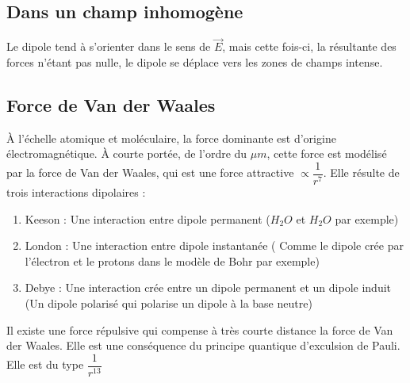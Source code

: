 \subsection{Dans un champ inhomogène}
\begin{prop}
Le dipole tend à s'orienter dans le sens de $\overrightarrow{E}$, mais cette fois-ci, la résultante des forces n'étant pas nulle, le dipole se déplace vers les zones de champs intense.
\end{prop}
\subsection{Force de Van der Waales}
\begin{de}
À l'échelle atomique et moléculaire, la force dominante est d'origine électromagnétique. À courte portée, de l'ordre du $\mu m$, cette force est modélisé par la force de Van der Waales, qui est une force attractive $\propto \dfrac{1}{r^7}$. Elle résulte de trois interactions dipolaires :
\begin{enumerate}[1-]
 \item Keeson : Une interaction entre dipole permanent ($H_2O$ et $H_2O$ par exemple)
 \item London : Une interaction entre dipole instantanée ( Comme le dipole crée par l'électron et le protons dans le modèle de Bohr par exemple)
 \item Debye : Une interaction crée entre un dipole permanent et un dipole induit (Un dipole polarisé qui polarise un dipole à la base neutre)
\end{enumerate}
Il existe une force répulsive qui compense à très courte distance la force de Van der Waales. Elle est une conséquence du principe quantique d'exculsion de Pauli. Elle est du type $\dfrac{1}{r^{13}}$
\end{de}

